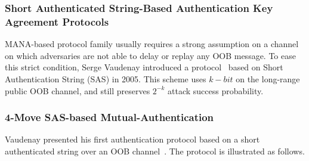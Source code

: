 \begin{enumerate}
\begin{enumerate}
\subsubsection{Short Authenticated String-Based Authentication Key Agreement Protocols}

MANA-based protocol family usually requires a strong assumption on a channel on which adversaries are not able to delay or replay any OOB message. To ease this strict condition, Serge Vaudenay introduced a protocol~\cite{Vaudenay:2005qa} based on Short Authentication String (SAS) in 2005. This scheme uses $k-bit$ on the long-range public OOB channel, and still preserves $2^{-k}$ attack success probability.

\subsubsection*{4-Move SAS-based Mutual-Authentication}

Vaudenay presented his first authentication protocol based on a short authenticated string over an OOB channel~\cite{Vaudenay:2005qa}. The protocol is illustrated as follows.


\end{enumerate}
\end{enumerate}
